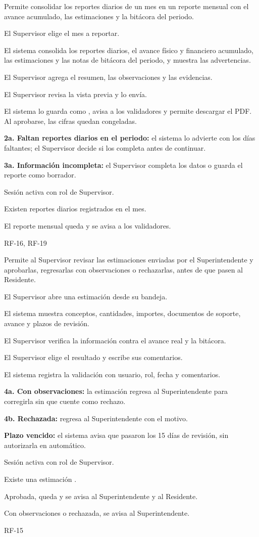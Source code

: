 {Permite consolidar los reportes diarios de un mes en un reporte mensual con el avance acumulado, las estimaciones y la bitácora del periodo.}
{\item El Supervisor elige el mes a reportar.
 \item El sistema consolida los reportes diarios, el avance físico y financiero acumulado, las estimaciones y las notas de bitácora del periodo, y muestra las advertencias.
 \item El Supervisor agrega el resumen, las observaciones y las evidencias.
 \item El Supervisor revisa la vista previa y lo envía.
 \item El sistema lo guarda como , avisa a los validadores y permite descargar el PDF. Al aprobarse, las cifras quedan congeladas.}
{\item \textbf{2a. Faltan reportes diarios en el periodo:} el sistema lo advierte con los días faltantes; el Supervisor decide si los completa antes de continuar.
 \item \textbf{3a. Información incompleta:} el Supervisor completa los datos o guarda el reporte como borrador.}
{\item Sesión activa con rol de Supervisor.
 \item Existen reportes diarios registrados en el mes.}
{\item El reporte mensual queda  y se avisa a los validadores.}
{RF-16, RF-19}

{Permite al Supervisor revisar las estimaciones enviadas por el Superintendente y aprobarlas, regresarlas con observaciones o rechazarlas, antes de que pasen al Residente.}
{\item El Supervisor abre una estimación  desde su bandeja.
 \item El sistema muestra conceptos, cantidades, importes, documentos de soporte, avance y plazos de revisión.
 \item El Supervisor verifica la información contra el avance real y la bitácora.
 \item El Supervisor elige el resultado y escribe sus comentarios.
 \item El sistema registra la validación con usuario, rol, fecha y comentarios.}
{\item \textbf{4a. Con observaciones:} la estimación regresa al Superintendente para corregirla sin que cuente como rechazo.
 \item \textbf{4b. Rechazada:} regresa al Superintendente con el motivo.
 \item \textbf{Plazo vencido:} el sistema avisa que pasaron los 15 días de revisión, sin autorizarla en automático.}
{\item Sesión activa con rol de Supervisor.
 \item Existe una estimación .}
{\item Aprobada, queda  y se avisa al Superintendente y al Residente.
 \item Con observaciones o rechazada, se avisa al Superintendente.}
{RF-15}

